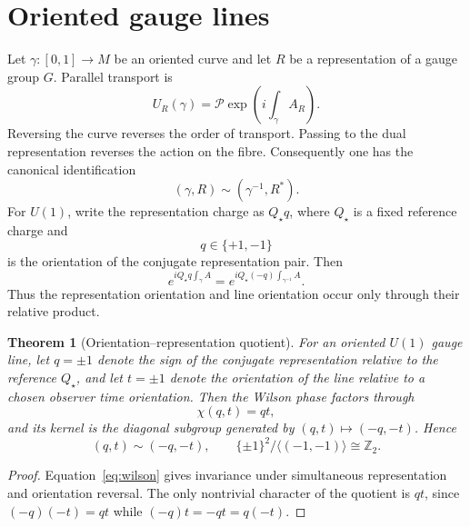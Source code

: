 \documentclass[11pt]{article}
\newtheorem{theorem}{Theorem}[section]
\theoremstyle{definition}\newtheorem{definition}[theorem]{Definition}
\theoremstyle{remark}\newtheorem{remark}[theorem]{Remark}\newtheorem{conjecture}[theorem]{Conjecture}
\begin{document}
\section{Oriented gauge lines}
Let $\gamma:[0,1]\to M$ be an oriented curve and let $R$ be a representation of a gauge group $G$. Parallel transport is
\begin{equation}
 U_R(\gamma)=\mathcal P\exp\!\left(i\int_\gamma A_R\right).
\end{equation}
Reversing the curve reverses the order of transport. Passing to the dual representation reverses the action on the fibre. Consequently one has the canonical identification
\begin{equation}\label{eq:linequot}
 (\gamma,R)\sim(\gamma^{-1},R^*).
\end{equation}
For $U(1)$, write the representation charge as $Q_\star q$, where $Q_\star$ is a fixed reference charge and
\begin{equation}
 q\in\{+1,-1\}
\end{equation}
is the orientation of the conjugate representation pair. Then
\begin{equation}\label{eq:wilson}
 e^{iQ_\star q\int_\gamma A}
 =e^{iQ_\star(-q)\int_{\gamma^{-1}}A}.
\end{equation}
Thus the representation orientation and line orientation occur only through their relative product.

\begin{theorem}[Orientation--representation quotient]\label{thm:quotient}
For an oriented $U(1)$ gauge line, let $q=\pm1$ denote the sign of the conjugate representation relative to the reference $Q_\star$, and let $t=\pm1$ denote the orientation of the line relative to a chosen observer time orientation. Then the Wilson phase factors through
\begin{equation}\label{eq:chiqt}
 \boxed{\chi(q,t)=qt,}
\end{equation}
and its kernel is the diagonal subgroup generated by $(q,t)\mapsto(-q,-t)$. Hence
\begin{equation}\label{eq:qtquotient}
 (q,t)\sim(-q,-t),\qquad
 \{\pm1\}^2/\langle(-1,-1)\rangle\cong\mathbb Z_2.
\end{equation}
\end{theorem}
\begin{proof}
Equation~\eqref{eq:wilson} gives invariance under simultaneous representation and orientation reversal. The only nontrivial character of the quotient is $qt$, since $(-q)(-t)=qt$ while $(-q)t=-qt=q(-t)$.
\end{proof}
\end{document}
